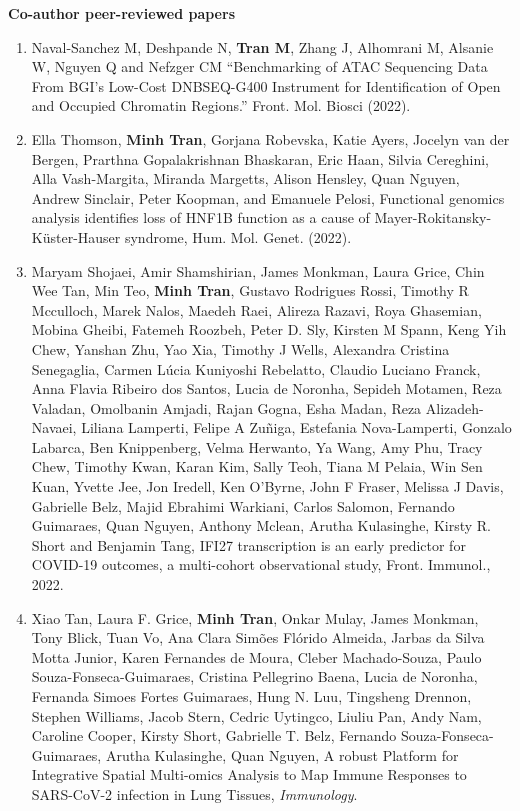     \textbf{Co-author peer-reviewed papers}
    \begin{enumerate}
        \item \cite{naval2022benchmarking} Naval-Sanchez M, Deshpande N, \textbf{Tran M}, Zhang J, Alhomrani M, Alsanie W, Nguyen Q and Nefzger CM ``Benchmarking of ATAC Sequencing Data From BGI’s Low-Cost DNBSEQ-G400 Instrument for Identification of Open and Occupied Chromatin Regions.'' Front. Mol. Biosci (2022).

        \item Ella Thomson, \textbf{Minh Tran}, Gorjana Robevska, Katie Ayers, Jocelyn van der Bergen, Prarthna Gopalakrishnan Bhaskaran, Eric Haan, Silvia Cereghini, Alla Vash-Margita, Miranda Margetts, Alison Hensley, Quan Nguyen, Andrew Sinclair, Peter Koopman, and Emanuele Pelosi, Functional genomics analysis identifies loss of HNF1B function as a cause of Mayer-Rokitansky-Küster-Hauser syndrome, Hum. Mol. Genet. (2022).

        \item Maryam Shojaei, Amir Shamshirian, James Monkman, Laura Grice, Chin Wee Tan, Min Teo, \textbf{Minh Tran}, Gustavo Rodrigues Rossi, Timothy R Mcculloch, Marek Nalos, Maedeh Raei, Alireza Razavi, Roya Ghasemian, Mobina Gheibi, Fatemeh Roozbeh, Peter D. Sly, Kirsten M Spann, Keng Yih Chew, Yanshan Zhu, Yao Xia, Timothy J Wells, Alexandra Cristina Senegaglia, Carmen Lúcia Kuniyoshi Rebelatto, Claudio Luciano Franck, Anna Flavia Ribeiro dos Santos, Lucia de Noronha, Sepideh Motamen, Reza Valadan, Omolbanin Amjadi, Rajan Gogna, Esha Madan, Reza Alizadeh-Navaei, Liliana Lamperti, Felipe A Zuñiga, Estefania Nova-Lamperti, Gonzalo Labarca, Ben Knippenberg, Velma Herwanto, Ya Wang, Amy Phu, Tracy Chew, Timothy Kwan, Karan Kim, Sally Teoh, Tiana M Pelaia, Win Sen Kuan, Yvette Jee, Jon Iredell, Ken O'Byrne, John F Fraser, Melissa J Davis, Gabrielle Belz, Majid Ebrahimi Warkiani, Carlos Salomon, Fernando Guimaraes, Quan Nguyen, Anthony Mclean, Arutha Kulasinghe, Kirsty R. Short and Benjamin Tang, IFI27 transcription is an early predictor for COVID-19 outcomes, a multi-cohort observational study, Front. Immunol., 2022.

        \item Xiao Tan, Laura F. Grice, \textbf{Minh Tran}, Onkar Mulay, James Monkman, Tony Blick, Tuan Vo, Ana Clara Simões Flórido Almeida, Jarbas da Silva Motta Junior, Karen Fernandes de Moura, Cleber Machado-Souza, Paulo Souza-Fonseca-Guimaraes, Cristina Pellegrino Baena, Lucia de Noronha, Fernanda Simoes Fortes Guimaraes, Hung N. Luu, Tingsheng Drennon, Stephen Williams, Jacob Stern, Cedric Uytingco, Liuliu Pan, Andy Nam, Caroline Cooper, Kirsty Short, Gabrielle T. Belz, Fernando Souza-Fonseca-Guimaraes, Arutha Kulasinghe, Quan Nguyen, A robust Platform for Integrative Spatial Multi-omics Analysis to Map Immune Responses to SARS-CoV-2 infection in Lung Tissues, \textit{Immunology}.
    \end{enumerate}
	


